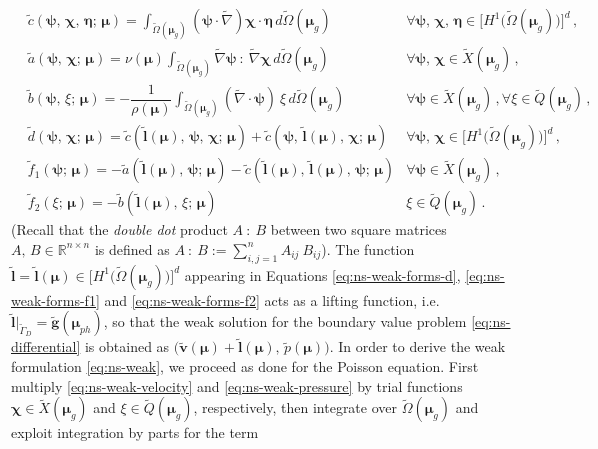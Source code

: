\documentclass[12pt, a4paper, twoside, openright]{report}
\numberwithin{equation}{chapter}
\theoremstyle{theorem}
\theoremstyle{definition}
\theoremstyle{remark}
\theoremstyle{proposition}
\numberwithin{figure}{chapter}
\newcommand{\wt}[1]{\widetilde{#1}}
\newcommand{\bg}[1]{\boldsymbol{#1}}
\begin{document}
		\begin{subequations}
			\label{eq:ns-weak-forms}
			\begin{align}
				\label{eq:ns-weak-forms-c}
				& \wt{c}(\bg{\psi}, \, \bg{\chi}, \, \bg{\eta}; \, \bg{\mu}) = \int_{\wt{\Omega}(\bg{\mu}_g)} \left( \bg{\psi} \cdot \wt{\nabla} \right) \bg{\chi} \cdot \bg{\eta} \, d\wt{\Omega}(\bg{\mu}_g) & \forall \bg{\psi}, \, \bg{\chi}, \, \bg{\eta} \in \big[ H^1 \big( \wt{\Omega}(\bg{\mu}_g) \big) \big]^d \, , \\[0.2cm]
				\label{eq:ns-weak-forms-a}
				& \wt{a}(\bg{\psi}, \, \bg{\chi}; \, \bg{\mu}) = \nu(\bg{\mu}) \int_{\wt{\Omega}(\bg{\mu}_g)} \wt{\nabla} \bg{\psi} ~ : ~ \wt{\nabla} \bg{\chi} \, d\wt{\Omega}(\bg{\mu}_g) & \forall \bg{\psi}, \, \bg{\chi} \in \wt{X}(\bg{\mu}_g) \, , \\[0.2cm]
				\label{eq:ns-weak-forms-b}
				& \wt{b}(\bg{\psi}, \, \xi; \, \bg{\mu}) = - \dfrac{1}{\rho(\bg{\mu})} \int_{\wt{\Omega}(\bg{\mu}_g)} \left( \wt{\nabla} \cdot \bg{\psi} \right) ~ \xi \, d\wt{\Omega}(\bg{\mu}_g) & \forall \bg{\psi} \in \wt{X}(\bg{\mu}_g) \, , \forall \xi \in \wt{Q}(\bg{\mu}_g) \, , \\[0.2cm]
				\label{eq:ns-weak-forms-d}
				& \wt{d}(\bg{\psi}, \, \bg{\chi}; \, \bg{\mu}) = \wt{c}(\wt{\bg{l}}(\bg{\mu}), \, \bg{\psi}, \, \bg{\chi}; \, \bg{\mu}) + \wt{c}(\bg{\psi}, \, \wt{\bg{l}}(\bg{\mu}), \, \bg{\chi}; \, \bg{\mu}) & \forall \bg{\psi}, \, \bg{\chi} \in \big[ H^1 \big( \wt{\Omega}(\bg{\mu}_g) \big) \big]^d \, , \\[0.2cm]
				\label{eq:ns-weak-forms-f1}
				& \wt{f}_1(\bg{\psi}; \, \bg{\mu}) = -\wt{a}(\wt{\bg{l}}(\bg{\mu}), \, \bg{\psi}; \, \bg{\mu}) - \wt{c}(\wt{\bg{l}}(\bg{\mu}), \, \wt{\bg{l}}(\bg{\mu}), \, \bg{\psi}; \, \bg{\mu}) & \forall \bg{\psi} \in \wt{X}(\bg{\mu}_g) \, , \\[0.2cm]
				\label{eq:ns-weak-forms-f2}
				& \wt{f}_2(\xi; \, \bg{\mu}) = - \wt{b}(\wt{\bg{l}}(\bg{\mu}), \, \xi; \, \bg{\mu}) & \xi \in \wt{Q}(\bg{\mu}_g) \, .
			\end{align}
		\end{subequations}
		(Recall that the \emph{double dot} product $A ~ : ~ B$ between two square matrices $A, \, B \in \mathbb{R}^{n \times n}$ is defined as $A ~ : ~ B := \sum_{i,j = 1}^n A_{ij} ~ B_{ij}$). The function $\wt{\bg{l}} = \wt{\bg{l}}(\bg{\mu}) \in \big[ H^1 \big( \wt{\Omega}(\bg{\mu}_g) \big) \big]^d$ appearing in Equations \eqref{eq:ns-weak-forms-d}, \eqref{eq:ns-weak-forms-f1} and \eqref{eq:ns-weak-forms-f2} acts as a lifting function, i.e. $\wt{\bg{l}} \vert_{\wt{\Gamma}_D} = \wt{\bg{g}}(\bg{\mu}_{ph})$, so that the weak solution for the boundary value problem \eqref{eq:ns-differential} is obtained as $\big( \wt{\bg{v}}(\bg{\mu}) + \wt{\bg{l}}(\bg{\mu}), \, \wt{p}(\bg{\mu}) \big)$. In order to derive the weak formulation \eqref{eq:ns-weak}, we proceed as done for the Poisson equation. First multiply \eqref{eq:ns-weak-velocity} and \eqref{eq:ns-weak-pressure} by trial functions $\bg{\chi} \in \wt{X}(\bg{\mu}_g)$ and $\xi \in \wt{Q}(\bg{\mu}_g)$, respectively, then integrate over $\wt{\Omega}(\bg{\mu}_g)$ and exploit integration by parts for the term
\end{document}
